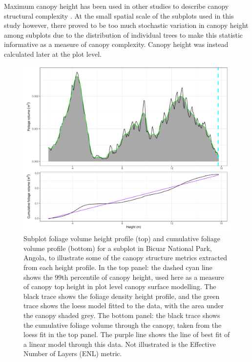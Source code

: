 \begin{refsection}
Maximum canopy height has been used in other studies to describe canopy structural complexity \citep{Scheuermann2018}. At the small spatial scale of the subplots used in this study however, there proved to be too much stochastic variation in canopy height among subplots due to the distribution of individual trees to make this statistic informative as a measure of canopy complexity. Canopy height was instead calculated later at the plot level. 

\begin{figure}
\centering
	\includegraphics[width=\linewidth]{img/height_profile_illus_all}
	\caption[Annotated subplot foliage volume height profile]{Subplot foliage volume height profile (top) and cumulative foliage volume profile (bottom) for a subplot in Bicuar National Park, Angola, to illustrate some of the canopy structure metrics extracted from each height profile. In the top panel: the dashed cyan line shows the 99th percentile of canopy height, used here as a measure of canopy top height in plot level canopy surface modelling. The black trace shows the foliage density height profile, and the green trace shows the loess model fitted to the data, with the area under the canopy shaded grey. The bottom panel: the black trace shows the cumulative foliage volume through the canopy, taken from the loess fit in the top panel. The purple line shows the line of best fit of a linear model through this data. Not illustrated is the Effective Number of Layers (ENL) metric.}
	\label{workflow:height_profile_illus}
\end{figure}


\end{refsection}
